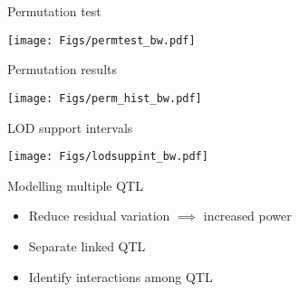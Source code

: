 \documentclass[12pt]{article}
\newcommand{\headsize}{\fontsize{35}{35} \selectfont}
\newcommand{\smallsize}{\fontsize{25}{30} \selectfont}
\begin{document}
\newpage

\headsize \color{myyellow}
\hfill \begin{minipage}{5.75in}
\centering
Permutation test
\end{minipage}

\vspace{2cm}

\centerline{\texttt{[image: Figs/permtest\_bw.pdf]}}

\newpage

\headsize \color{myyellow}
\hfill \begin{minipage}{5.75in}
\centering
Permutation results
\end{minipage}

\vfill

\centerline{\texttt{[image: Figs/perm\_hist\_bw.pdf]}}






\newpage

\addtocounter{page}{+2}

\headsize \color{myyellow}
\hfill \begin{minipage}{5.75in}
\centering
LOD support intervals
\end{minipage}

\vfill

\centerline{\texttt{[image: Figs/lodsuppint\_bw.pdf]}}






\newpage

\headsize \color{myyellow}
\hfill \begin{minipage}{5.75in}
\centering
Modelling multiple QTL
\end{minipage}

\vspace{2cm}

\color{mywhite} \smallsize

\hfill \begin{minipage}[t]{10in}
\begin{itemize}
\itemsep24pt
\item Reduce residual variation $\implies$ increased power

\item Separate linked QTL

\item Identify interactions among QTL

\end{itemize}
\end{minipage}
\end{document}
